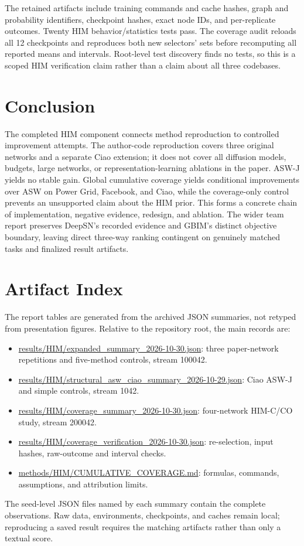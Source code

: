\documentclass[10pt,twocolumn]{article}
\begin{document}
The retained artifacts include training commands and cache hashes, graph and probability identifiers, checkpoint hashes, exact node IDs, and per-replicate outcomes. Twenty HIM behavior/statistics tests pass. The coverage audit reloads all 12 checkpoints and reproduces both new selectors' sets before recomputing all reported means and intervals. Root-level test discovery finds no tests, so this is a scoped HIM verification claim rather than a claim about all three codebases.

\section{Conclusion}
The completed HIM component connects method reproduction to controlled improvement attempts. The author-code reproduction covers three original networks and a separate Ciao extension; it does not cover all diffusion models, budgets, large networks, or representation-learning ablations in the paper. ASW-J yields no stable gain. Global cumulative coverage yields conditional improvements over ASW on Power Grid, Facebook, and Ciao, while the coverage-only control prevents an unsupported claim about the HIM prior. This forms a concrete chain of implementation, negative evidence, redesign, and ablation. The wider team report preserves DeepSN's recorded evidence and GBIM's distinct objective boundary, leaving direct three-way ranking contingent on genuinely matched tasks and finalized result artifacts.

\appendix
\section{Artifact Index}
The report tables are generated from the archived JSON summaries, not retyped from presentation figures. Relative to the repository root, the main records are:
\begin{itemize}[leftmargin=1.2em,itemsep=0.1em]
\item \url{results/HIM/expanded_summary_2026-10-30.json}: three paper-network repetitions and five-method controls, stream 100042.
\item \url{results/HIM/structural_asw_ciao_summary_2026-10-29.json}: Ciao ASW-J and simple controls, stream 1042.
\item \url{results/HIM/coverage_summary_2026-10-30.json}: four-network HIM-C/CO study, stream 200042.
\item \url{results/HIM/coverage_verification_2026-10-30.json}: re-selection, input hashes, raw-outcome and interval checks.
\item \url{methods/HIM/CUMULATIVE_COVERAGE.md}: formulas, commands, assumptions, and attribution limits.
\end{itemize}
The seed-level JSON files named by each summary contain the complete observations. Raw data, environments, checkpoints, and caches remain local; reproducing a saved result requires the matching artifacts rather than only a textual score.
\end{document}
